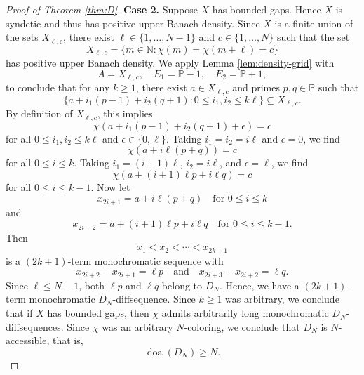 \documentclass{amsart}
\theoremstyle{definition}
\begin{document}
\begin{proof}[Proof of Theorem \ref{thm:D}]
\medskip
\noindent \textbf{Case 2.} Suppose $X$ has bounded gaps. Hence $X$ is syndetic and thus has positive upper Banach density. Since $X$ is a finite union of the sets $X_{\ell,c}$, there exist $\ell \in \{1,\dots,N-1\}$ and $c \in \{1,\dots,N\}$ such that the set $$X_{\ell,c}=\{m \in \mathbb{N}:\chi(m)=\chi(m+\ell)=c\}$$ has positive upper Banach density. We apply Lemma \ref{lem:density-grid} with $$A=X_{\ell,c}, \quad E_1=\mathbb{P}-1, \quad E_2=\mathbb{P}+1,$$ to conclude that for any $k \geq 1$, there exist $a \in X_{\ell,c}$ and primes $p,q \in \mathbb{P}$ such that $$\{a+i_1(p-1)+i_2(q+1) : 0 \leq i_1,i_2 \leq k\ell \} \subseteq X_{\ell,c}.$$ By definition of $X_{\ell,c}$, this implies $$\chi\left(a+i_1(p-1)+i_2(q+1)+\epsilon\right)=c
$$ for all $0\leq i_1,i_2\leq k\ell$ and $\epsilon\in\{0,\ell\}$. Taking $i_1=i_2=i \ell$ and $\epsilon=0$, we find $$\chi(a+i\ell(p+q) )=c$$ for all $0 \leq i \leq k$. Taking $i_1=(i+1)\ell$, $i_2=i\ell$, and $\epsilon=\ell$, we find $$\chi(a+(i+1)\ell p+i\ell q)=c$$ for all $0 \leq i \leq k-1$. Now let $$x_{2i+1}=a+i\ell(p+q) \quad \text{for } 0 \leq i \leq k$$ and $$x_{2i+2}=a+(i+1)\ell p + i\ell q \quad \text{for } 0 \leq i \leq k-1.$$ Then $$x_1<x_2<\cdots<x_{2k+1}$$ is a $(2k+1)$-term monochromatic sequence with $$x_{2i+2}-x_{2i+1}=\ell p \quad \text{and} \quad x_{2i+3}-x_{2i+2}=\ell q.$$ Since $\ell\leq N-1$, both $\ell p$ and $\ell q$ belong to $D_N$. Hence, we have a $(2k+1)$-term monochromatic $D_{N}$-diffsequence. Since $k \geq 1$ was arbitrary, we conclude that if $X$ has bounded gaps, then $\chi$ admits arbitrarily long monochromatic $D_{N}$-diffsequences. Since $\chi$ was an arbitrary $N$-coloring, we conclude that $D_{N}$ is $N$-accessible, that is, $$\operatorname{doa}(D_{N}) \geq N.$$


\end{proof}
\end{document}
